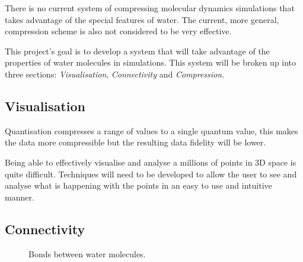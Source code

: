 \documentclass[a4paper,twocolumn]{article}
\begin{document}
There is no current system of compressing molecular dynamics simulations that
takes advantage of the special features of water. The current, more general,
compression scheme is also not considered to be very effective.

This project's goal is to develop a system that will take advantage of the
properties of water molecules in simulations. This system will be broken up
into three sections: \textit{Visualisation}, \textit{Connectivity} and
\textit{Compression}.


\subsection{Visualisation}
Quantisation compresses a range of values to a single quantum value, this makes
the data more compressible but the resulting data fidelity will be lower.


Being able to effectively visualise and analyse a millions of points in 3D
space is quite difficult. Techniques will need to be developed to allow the
user to see and analyse what is happening with the points in an easy to use
and intuitive manner.


\subsection{Connectivity}

\begin{figure}[!h]
\centering
{}
\caption{Bonds between water molecules.}
\label{fig:water}
\end{figure}
\end{document}
